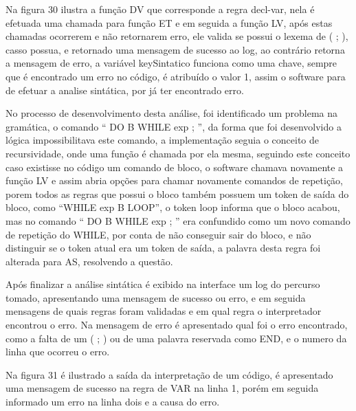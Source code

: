 \documentclass[12pt,oneside,a4paper,chapter=TITLE,section=TITLE,sumario=tradicional]{abntex2}
\begin{document}
Na figura 30 ilustra a função DV que corresponde a regra decl-var, nela é efetuada uma chamada para função ET e em seguida a função LV, após estas chamadas ocorrerem e não retornarem erro, ele valida se possui o lexema de ( ; ), casso possua, e retornado uma mensagem de sucesso ao log, ao contrário retorna a mensagem de erro, a variável keySintatico funciona como uma chave, sempre que é encontrado um erro no código, é atribuído o valor 1, assim o software para de efetuar a analise sintática, por já ter encontrado erro. 

\begin{figure}[htb]
\end{figure} 

No processo de desenvolvimento desta análise, foi identificado um problema na gramática, o comando “ DO B WHILE exp ; ”, da forma que foi desenvolvido a lógica impossibilitava este comando, a implementação seguia o conceito de recursividade, onde uma função é chamada por ela mesma, seguindo este conceito caso existisse no código um comando de bloco, o software chamava novamente a função LV e assim abria opções para chamar novamente comandos de repetição, porem todos as regras que possui o bloco também possuem um token de saída do bloco, como “WHILE exp B LOOP”, o token loop informa que o bloco acabou, mas no comando “ DO B WHILE exp ; ” era confundido como um novo comando de repetição do WHILE, por conta de não conseguir sair do bloco, e não distinguir se o token atual era um token de saída, a palavra desta regra foi alterada para AS, resolvendo a questão.

Após finalizar a análise sintática é exibido na interface um log do percurso tomado, apresentando uma mensagem de sucesso ou erro, e em seguida mensagens de quais regras foram validadas e em qual regra o interpretador encontrou o erro.  Na mensagem de erro é apresentado qual foi o erro encontrado, como a falta de um ( ; ) ou de uma palavra reservada como END, e o numero da linha que ocorreu o erro.

Na figura 31 é ilustrado a saída da interpretação de um código, é apresentado uma mensagem de sucesso na regra de VAR na linha 1, porém em seguida informado um erro na linha dois e a causa do erro.

\begin{figure}[htb]
\end{figure} 
\end{document}
